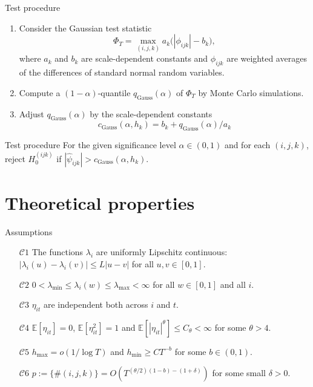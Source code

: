 \documentclass[10pt]{beamer}
\newcommand{\E}{\mathbb{E}}
\begin{document}
\begin{frame}[label = frame_test]{Test procedure}

\begin{enumerate}
	\item Consider the Gaussian test statistic 
	\vspace{-2mm} \[ \Phi_T = \max_{(i,j,k)} a_k \big( |\phi_{ijk}| - b_k \big), \] where $a_k$ and $b_k$ are scale-dependent constants and $\phi_{ijk}$ are weighted averages of the differences of standard normal random variables.\pause
	\item Compute a $(1-\alpha)$-quantile $q_{\text{Gauss}} (\alpha)$ of $\Phi_T$ by Monte Carlo simulations.\pause
	\item Adjust $q_{ \text{Gauss}} (\alpha)$ by the scale-dependent constants \vspace{-2mm}  \[c_{\text{Gauss}}(\alpha,h_k) = b_k + q_{\text{Gauss}}(\alpha)/a_k\] \pause
\end{enumerate}
\vspace{-5mm}
\begin{block}{Test procedure}
For the given significance level $\alpha \in (0,1)$ and for each $(i,j,k)$, reject $H_0^{(ijk)}$ if $|\widehat{\psi}_{ijk}| > c_{\text{Gauss}}(\alpha,h_k)$.

\end{block}
\end{frame}



\section{Theoretical properties}
\begin{frame}{Assumptions}
\begin{itemize}
\item[$\mathcal{C}1$] \label{C1} The functions $\lambda_i$ are uniformly Lipschitz continuous: $|\lambda_i(u) - \lambda_i(v)| \le L |u-v|$ for all $u, v \in [0,1]$.
\item[$\mathcal{C}2$] \label{C2} $0 < \lambda_{\min} \le \lambda_i(w) \le \lambda_{\max} < \infty$ for all $w \in [0, 1]$ and all $i$. 
\item[$\mathcal{C}3$] \label{C3} $\eta_{it}$ are independent both across $i$ and $t$.
\item[$\mathcal{C}4$] \label{C4} $\E[\eta_{it}] = 0$, $\E[\eta_{it}^2] = 1$ and $\E[|\eta_{it}|^\theta] \le C_\theta < \infty$ for some $\theta > 4$. 
\item[$\mathcal{C}5$] \label{C5} $h_{\max} = o(1/\log T)$ and $h_{\min} \ge CT^{-b}$ for some $b \in (0,1)$.
\item[$\mathcal{C}6$] \label{C6} $p := \{ \# (i, j, k) \} = O(T^{(\theta/2)(1-b)-(1+\delta)})$ for some small $\delta > 0$.
\end{itemize}
\end{frame}
\end{document}
